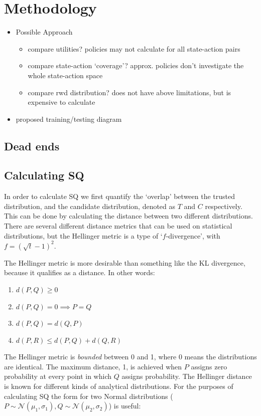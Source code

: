 \section{Methodology}
    \begin{itemize}
        \item Possible Approach
        \begin{itemize}
            \item compare utilities? policies may not calculate for all state-action pairs
            \item compare state-action `coverage'? approx. policies don't investigate the whole state-action space
            \item compare rwd distribution? does not have above limitations, but is expensive to calculate
        \end{itemize}
        \item proposed training/testing diagram
    \end{itemize}

\subsection{Dead ends}



\subsection{Calculating SQ}
In order to calculate SQ we first quantify the `overlap' between the trusted distribution, and the candidate distribution, denoted as $T$ and $C$ respectively. This can be done by calculating the distance between two different distributions. There are several different distance metrics that can be used on statistical distributions, but the Hellinger metric is a type of `$f$-divergence', with $f=(\sqrt{t}-1)^2$.

The Hellinger metric is more desirable than something like the KL divergence, because it qualifies as a distance. In other words:

\begin{enumerate}
    \item $d(P,Q) \geq 0$
    \item $d(P,Q) = 0 \implies P=Q$
    \item $d(P,Q) = d(Q,P)$
    \item $d(P,R) \leq d(P,Q) + d(Q,R)$
\end{enumerate}

The Hellinger metric is \emph{bounded} between 0 and 1, where 0 means the distributions are identical. The maximum distance, 1, is achieved when $P$ assigns zero probability at every point in which $Q$ assigns probability. The Hellinger distance is known for different kinds of analytical distributions. For the purposes of calculating SQ the form for two Normal distributions ($P \sim \mathcal{N}(\mu_1,\sigma_1), Q\sim\mathcal{N}(\mu_2,\sigma_2)$) is useful:

